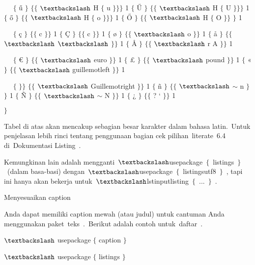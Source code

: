 ~~ $ \{ $ ű $ \} $ $ \{ $$ \{ $ $\textbackslash$ H $ \{ $ u $ \} $$ \} $$ \} $ 1 $ \{ $ Ű $ \} $ $ \{ $$ \{ $ $\textbackslash$ H $ \{ $ U $ \} $$ \} $$ \} $ 1 $ \{ $ ő $ \} $ $ \{ $$ \{ $ $\textbackslash$ H $ \{ $ o $ \} $$ \} $$ \} $ 1 $ \{ $ Ő $ \} $ $ \{ $$ \{ $ $\textbackslash$ H $ \{ $ O $ \} $$ \} $ $ \} $ 1\par

~~ $ \{ $ ç $ \} $ $ \{ $$ \{ $ c $ \} $$ \} $ 1 $ \{ $ Ç $ \} $ $ \{ $$ \{ $ c $ \} $$ \} $ 1 $ \{ $ ø $ \} $ $ \{ $$ \{ $ $\textbackslash$ o $ \} $$ \} $ 1 $ \{ $ å $ \} $ $ \{ $$ \{ $ $\textbackslash$ $\textbackslash$ $ \} $$ \} $ 1 $ \{ $ Å $ \} $ $ \{ $$ \{ $ $\textbackslash$ r A $ \} $$ \} $ 1\par

~~ $ \{ $ € $ \} $ $ \{ $$ \{ $ $\textbackslash$ euro $ \} $$ \} $ 1 $ \{ $ £ $ \} $ $ \{ $$ \{ $ $\textbackslash$ pound $ \} $$ \} $ 1 $ \{ $ « $ \} $ $ \{ $$ \{ $ $\textbackslash$ guillemotleft $ \} $$ \} $ 1\par

~~ $ \{ $ $ \} $$ \} $ $ \{ $$ \{ $ $\textbackslash$ Guillemotright $ \} $$ \} $ 1 $ \{ $ ñ $ \} $ $ \{ $$ \{ $ $\textbackslash$ $ \sim $ n $ \} $$ \} $ 1 $ \{ $ Ñ $ \} $ $ \{ $$ \{ $ $\textbackslash$ $ \sim $ N $ \} $$ \} $ 1 $ \{ $ ¿ $ \} $ $ \{ $$ \{ $ ? ` $ \} $$ \} $ 1\par

 $ \} $\par

Tabel di atas akan mencakup sebagian besar karakter dalam bahasa latin. Untuk penjelasan lebih rinci tentang penggunaan bagian cek pilihan literate 6.4 di Dokumentasi Listing .\par

Kemungkinan lain adalah mengganti $\textbackslash$usepackage $ \{ $ listings $ \} $ (dalam basa-basi) dengan $\textbackslash$usepackage $ \{ $ listingsutf8 $ \} $ , tapi ini hanya akan bekerja untuk $\textbackslash$lstinputlisting $ \{ $ ... $ \} $ .\par

Menyesuaikan caption \par

Anda dapat memiliki caption mewah (atau judul) untuk cantuman Anda menggunakan paket teks . Berikut adalah contoh untuk daftar .\par

 $\textbackslash$ usepackage $ \{ $ caption $ \} $\par

 $\textbackslash$ usepackage $ \{ $ listings $ \} $\par

